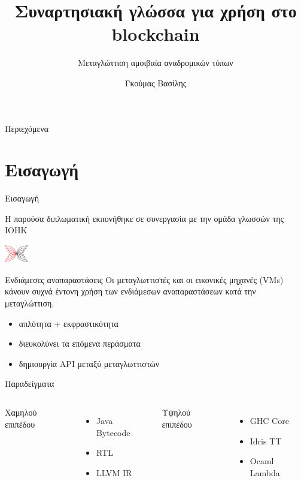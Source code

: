 \documentclass[10pt]{beamer}
\title{Συναρτησιακή γλώσσα για χρήση στο blockchain}
\subtitle{Μεταγλώττιση αμοιβαία αναδρομικών τύπων}
\date{}
\author{Γκούμας Βασίλης}
\institute{Εθνικό Μετσόβιο Πολυτεχνείο}
\begin{document}
\maketitle

\begin{frame}{Περιεχόμενα}
  \tableofcontents[hideallsubsections]
\end{frame}

\section{Εισαγωγή}


\begin{frame}[fragile]{Εισαγωγή}

  Η παρούσα διπλωματική εκπονήθηκε σε συνεργασία με την ομάδα
  γλωσσών της IOHK
 \begin{center}
    \includegraphics[width=1cm,height=0.8cm,keepaspectratio]{images/iohk-symbol.png}
  \end{center}

\end{frame}


\begin{frame}[fragile]{Ενδιάμεσες αναπαραστάσεις}
 Οι μεταγλωττιστές και οι εικονικές μηχανές (VMs) κάνουν συχνά έντονη χρήση
 των ενδιάμεσων αναπαραστάσεων κατά την μεταγλώττιση.

 \begin{itemize}
    \item  απλότητα + εκφραστικότητα
    \item  διευκολύνει τα επόμενα περάσματα
    \item  δημιουργία API μεταξύ μεταγλωττιστών
  \end{itemize}

\end{frame}

\begin{frame}{Παραδείγματα}

\begin{columns}[T,onlytextwidth]
      Χαμηλού επιπέδου
      \begin{itemize}
        \item Java Bytecode
        \item RTL
        \item LLVM IR
      \end{itemize}

      Υψηλού επιπέδου
      \begin{itemize}
          \item  GHC Core
        \item Idris TT
       \item Ocaml Lambda
      \end{itemize}
\end{columns}

\end{frame}
\end{document}
